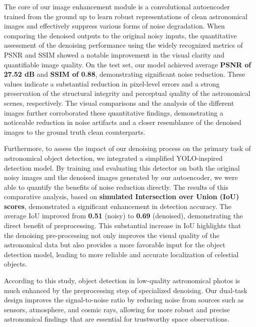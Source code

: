 \documentclass[12pt, conference]{IEEEtran}
\begin{document}
The core of our image enhancement module is a convolutional autoencoder trained from the ground up to learn robust representations of clean astronomical images and effectively suppress various forms of noise degradation. When comparing the denoised outputs to the original noisy inputs, the quantitative assessment of the denoising performance using the widely recognized metrics of PSNR \cite{hore2010image}and SSIM \cite{wang2004image} showed a notable improvement in the visual clarity and quantifiable image quality. On the test set, our model achieved average \textbf{PSNR of 27.52 dB} and \textbf{SSIM of 0.88}, demonstrating significant noise reduction.  These values indicate a substantial reduction in pixel-level errors and a strong preservation of the structural integrity and perceptual quality of the astronomical scenes, respectively. The visual comparisons and the analysis of the different images further corroborated these quantitative findings, demonstrating a noticeable reduction in noise artifacts and a closer resemblance of the denoised images to the ground truth clean counterparts.

Furthermore, to assess the impact of our denoising process on the primary task of astronomical object detection, we integrated a simplified YOLO-inspired \cite{redmon2016you}  detection model. By training and evaluating this detector on both the original noisy images and the denoised images generated by our autoencoder, we were able to quantify the benefits of noise reduction directly. The results of this comparative analysis, based on \textbf{simulated Intersection over Union (IoU) scores}, demonstrated a significant enhancement in detection accuracy. The average IoU improved from \textbf{0.51} (noisy) to\textbf{ 0.69} (denoised), demonstrating the direct benefit of preprocessing.
 This substantial increase in IoU highlights that the denoising pre-processing not only improves the visual quality of the astronomical data but also provides a more favorable input for the object detection model, leading to more reliable and accurate localization of celestial objects.

According to this study, object detection in low-quality astronomical photos is much enhanced by the preprocessing step of specialized denoising. Our dual-task design improves the signal-to-noise ratio by reducing noise from sources such as sensors, atmosphere, and cosmic rays, allowing for more robust and precise astronomical findings that are essential for trustworthy space observations.
\end{document}
